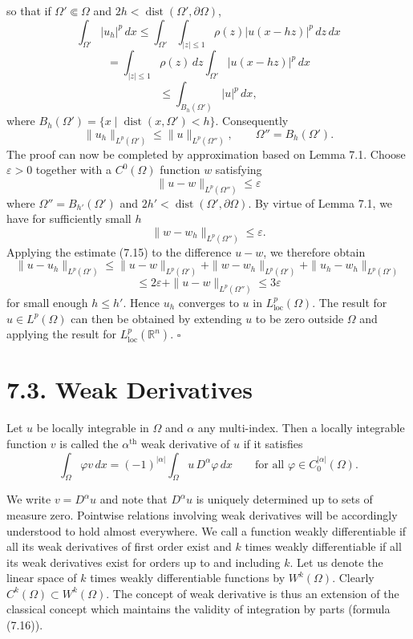 so that if $\Omega' \Subset \Omega$ and $2h<\operatorname{dist}(\Omega',\partial\Omega)$,
\[
\int_{\Omega'} |u_h|^p\,dx \le \int_{\Omega'} \int_{|z|\le 1} \rho(z)|u(x-hz)|^p\,dz\,dx
\]
\[
= \int_{|z|\le 1} \rho(z)\,dz \int_{\Omega'} |u(x-hz)|^p\,dx
\]
\[
\le \int_{B_h(\Omega')} |u|^p\,dx,
\]
where $B_h(\Omega')=\{x \mid \operatorname{dist}(x,\Omega')<h\}$. Consequently
\begin{equation}
\tag{7.15}
\|u_h\|_{L^p(\Omega')} \le \|u\|_{L^p(\Omega'')}, \qquad \Omega''=B_h(\Omega').
\end{equation}
The proof can now be completed by approximation based on Lemma 7.1. Choose
$\varepsilon>0$ together with a $C^0(\Omega)$ function $w$ satisfying
\[
\|u-w\|_{L^p(\Omega'')} \le \varepsilon
\]
where $\Omega''=B_{h'}(\Omega')$ and $2h'<\operatorname{dist}(\Omega',\partial\Omega)$. By virtue of Lemma 7.1, we have for
sufficiently small $h$
\[
\|w-w_h\|_{L^p(\Omega'')} \le \varepsilon.
\]
Applying the estimate (7.15) to the difference $u-w$, we therefore obtain
\[
\|u-u_h\|_{L^p(\Omega')}
\le \|u-w\|_{L^p(\Omega')} + \|w-w_h\|_{L^p(\Omega')} + \|u_h-w_h\|_{L^p(\Omega')}
\]
\[
\le 2\varepsilon + \|u-w\|_{L^p(\Omega'')} \le 3\varepsilon
\]
for small enough $h\le h'$. Hence $u_h$ converges to $u$ in $L^p_{\mathrm{loc}}(\Omega)$. The result for $u\in L^p(\Omega)$
can then be obtained by extending $u$ to be zero outside $\Omega$ and applying the result
for $L^p_{\mathrm{loc}}(\mathbb{R}^n)$. $\square$

\section*{7.3. Weak Derivatives}

Let $u$ be locally integrable in $\Omega$ and $\alpha$ any multi-index. Then a locally integrable
function $v$ is called the $\alpha^{\text{th}}$ weak derivative of $u$ if it satisfies
\begin{equation}
\tag{7.16}
\int_\Omega \varphi v\,dx = (-1)^{|\alpha|} \int_\Omega u\,D^\alpha \varphi\,dx
\qquad \text{for all } \varphi \in C_0^{|\alpha|}(\Omega).
\end{equation}


We write $v=D^\alpha u$ and note that $D^\alpha u$ is uniquely determined up to sets of measure
zero. Pointwise relations involving weak derivatives will be accordingly understood
to hold almost everywhere. We call a function weakly differentiable if all its weak
derivatives of first order exist and $k$ times weakly differentiable if all its weak
derivatives exist for orders up to and including $k$. Let us denote the linear space of $k$
times weakly differentiable functions by $W^k(\Omega)$. Clearly $C^k(\Omega)\subset W^k(\Omega)$. The
concept of weak derivative is thus an extension of the classical concept which
maintains the validity of integration by parts (formula (7.16)).

